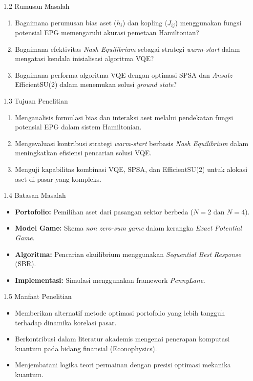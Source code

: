 \begin{frame}{1.2 Rumusan Masalah}
    \begin{enumerate}
        \item Bagaimana perumusan bias aset ($h_i$) dan kopling ($J_{ij}$) menggunakan fungsi potensial EPG memengaruhi akurasi pemetaan Hamiltonian?
        \item Bagaimana efektivitas \textit{Nash Equilibrium} sebagai strategi \textit{warm-start} dalam mengatasi kendala inisialisasi algoritma VQE?
        \item Bagaimana performa algoritma VQE dengan optimasi SPSA dan \textit{Ansatz} EfficientSU(2) dalam menemukan solusi \textit{ground state}?
    \end{enumerate}
\end{frame}

\begin{frame}{1.3 Tujuan Penelitian}
    \begin{enumerate}
        \item Menganalisis formulasi bias dan interaksi aset melalui pendekatan fungsi potensial EPG dalam sistem Hamiltonian.
        \item Mengevaluasi kontribusi strategi \textit{warm-start} berbasis \textit{Nash Equilibrium} dalam meningkatkan efisiensi pencarian solusi VQE.
        \item Menguji kapabilitas kombinasi VQE, SPSA, dan EfficientSU(2) untuk alokasi aset di pasar yang kompleks.
    \end{enumerate}
\end{frame}

\begin{frame}{1.4 Batasan Masalah}
    \begin{itemize}
        \item \textbf{Portofolio:} Pemilihan aset dari pasangan sektor berbeda ($N=2$ dan $N=4$).
        \item \textbf{Model Game:} Skema \textit{non zero-sum game} dalam kerangka \textit{Exact Potential Game}.
        \item \textbf{Algoritma:} Pencarian ekuilibrium menggunakan \textit{Sequential Best Response} (SBR).
        \item \textbf{Implementasi:} Simulasi menggunakan framework \textit{PennyLane}.
    \end{itemize}
\end{frame}

\begin{frame}{1.5 Manfaat Penelitian}
    \begin{itemize}
        \item Memberikan alternatif metode optimasi portofolio yang lebih tangguh terhadap dinamika korelasi pasar.
        \item Berkontribusi dalam literatur akademis mengenai penerapan komputasi kuantum pada bidang finansial (Econophysics).
        \item Menjembatani logika teori permainan dengan presisi optimasi mekanika kuantum.
    \end{itemize}
\end{frame}
